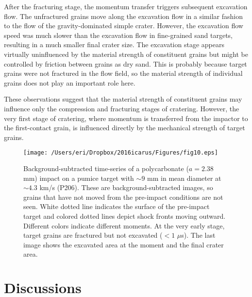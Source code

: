 \documentclass[3p,authoryear]{elsarticle}
\begin{document}
After the fracturing stage, the momentum transfer triggers subsequent excavation flow.
The unfractured grains move along the excavation flow in a similar fashion to the flow of the gravity-dominated simple crater. However, the excavation flow speed was much slower than the excavation flow in fine-grained sand targets, resulting in a much smaller final crater size. The excavation stage appears virtually uninfluenced by the material strength of constituent grains but might be controlled by friction between grains as dry sand. This is probably because target grains were not fractured in the flow field, so the material strength of individual grains does not play an important role here. 

These observations suggest that the material strength of constituent grains may influence only the compression and fracturing stages of cratering. However, the very first stage of cratering, where momentum is transferred from the impactor to the first-contact grain, is influenced directly by the mechanical strength of target grains.

\begin{figure*}[phtb]
	\centering
	\texttt{[image: /Users/eri/Dropbox/2016icarus/Figures/fig10.eps]}
	\caption{Background-subtracted time-series of a polycarbonate ($a=2.38$ mm) impact on a pumice target with $\sim 9$ mm in mean diameter at $\sim 4.3$ km/s (P206). These are background-subtracted images, so grains that have not moved from the pre-impact conditions are not seen. White dotted line indicates the surface of the pre-impact target and colored dotted lines depict shock fronts moving outward. Different colors indicate different moments. At the very early stage, target grains are fractured but not excavated ($< 1$ $\mu$s). The last image shows the excavated area at the moment and the final crater area.}
	\label{snapshots}
	\centering
\end{figure*}

\section{Discussions}

\end{document}

